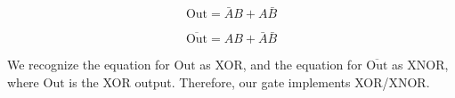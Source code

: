\documentclass[fleqn]{article}
\begin{document}
\begin{enumerate}
\begin{enumerate}
			\begin{equation*}
				\text{Out} = \bar{A}B + A\bar{B}
			\end{equation*}
			
			\begin{equation*}
				\overline{\text{Out}} = AB + \bar{A}\bar{B}
			\end{equation*}
			
			We recognize the equation for $\text{Out}$ as XOR, and the equation for $\overline{\text{Out}}$ as XNOR, where $\text{Out}$ is the XOR output. Therefore, our gate implements XOR/XNOR.
			
			\end{enumerate}			 
	\end{enumerate}
\end{document}
